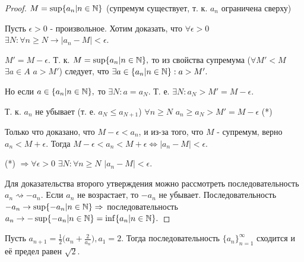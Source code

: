 	\begin{proof}
		$M = \sup\{a_n | n \in \mathbb N\}$ (супремум существует, т. к. $a_n$ ограничена сверху)
		
		Пусть $\epsilon > 0$ - произвольное. Хотим доказать, что $\forall \epsilon > 0$ $\exists N: \forall n \geqslant N \rightarrow |a_n - M| < \epsilon.$
		
		$M' = M - \epsilon.$ Т. к. $M = \sup\{a_n | n \in \mathbb N\},$ то из свойства супремума ($\forall M' < M$ $\exists a \in A$ $a > M'$) следует, что  $\exists a \in \{a_n | n \in \mathbb N\}: a > M'.$
		
		Но если $a \in \{a_n | n \in \mathbb N\},$ то $\exists N: a = a_N.$ Т. е. $\exists N: a_N > M' = M - \epsilon.$
		
		Т. к. $a_n$ не убывает (т. е. $a_N \leqslant a_{N + 1}$) $\forall n \geqslant N$ $a_n \geqslant a_N > M' = M - \epsilon$ (*)
		
		Только что доказано, что $M - \epsilon < a_n$, и из-за того, что $M$ - супремум, верно $a_n < M + \epsilon$. Тогда $M - \epsilon < a_n < M + \epsilon \Leftrightarrow |a_n - M| < \epsilon.$
		
		(*) $\Rightarrow \forall \epsilon > 0$ $\exists N: \forall n \geqslant N$ $|a_n - M| < \epsilon.$
		
		Для доказательства второго утверждения можно рассмотреть последовательность $a_n \rightsquigarrow -a_n.$ Если $a_n$ не возрастает, то $-a_n$ не убывает. Последовательность $-a_n \to \sup\{-a_n | n \in \mathbb N\} \Rightarrow$ последовательность $a_n \to -\sup\{-a_n | n \in \mathbb N\} = \inf\{a_n | n \in \mathbb N\}.$
	\end{proof}
	
	\begin{example}
		Пусть $a_{n + 1} = \frac{1}{2} \big(a_n + \frac{2}{a_n}\big), a_1 = 2$. Тогда последовательность $\{a_n\}^{\infty}_{n = 1}$ сходится и её предел равен $\sqrt{2}$.
	\end{example}
	
